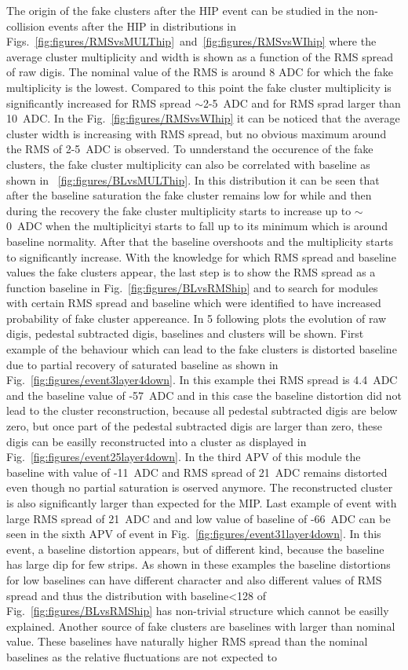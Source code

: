 The origin of the fake clusters after the HIP event can be studied in the non-collision events after the HIP in distributions in Figs.~\ref{fig:figures/RMSvsMULThip}~and~\ref{fig:figures/RMSvsWIhip} where the average cluster multiplicity and width is shown as a function of the RMS spread of raw digis. The nominal value of the RMS is around 8 ADC for which the fake multiplicity is the lowest. Compared to this point the fake cluster multiplicity is significantly increased for RMS spread $\sim$2-5~ADC and for RMS sprad larger than 10~ADC. In the Fig.~\ref{fig:figures/RMSvsWIhip} it can be noticed that the average cluster width is increasing with RMS spread, but no obvious maximum around the RMS of 2-5~ADC is observed. To unnderstand the occurence of the fake clusters, the fake cluster multiplicity can also be correlated with baseline as shown in ~\ref{fig:figures/BLvsMULThip}. In this distribution it can be seen that after the baseline saturation the fake cluster remains low for while and then during the recovery the fake cluster multiplicity starts to increase up to $\sim$ 0~ADC when the multiplicityi starts to fall up to its minimum which is around baseline normality. After that the baseline overshoots and the multiplicity starts to significantly increase. With the knowledge for which RMS spread and baseline values the fake clusters appear, the last step is to show the RMS spread as a function baseline in Fig.~\ref{fig:figures/BLvsRMShip} and to search for modules with certain RMS spread and baseline which were identified to have increased probability of fake cluster appereance. In 5 following plots the evolution of raw digis, pedestal subtracted digis, baselines and clusters will be shown. First example of the behaviour which can lead to the fake clusters is distorted baseline due to partial recovery of saturated baseline as shown in Fig.~\ref{fig:figures/event3layer4down}. In this example thei RMS spread is 4.4~ADC and the baseline value of -57~ADC and in this case the baseline distortion did not lead to the cluster reconstruction, because all pedestal subtracted digis are below zero, but once part of the pedestal subtracted digis are larger than zero, these digis can be easilly reconstructed into a cluster as displayed in Fig.~\ref{fig:figures/event25layer4down}. In the third APV of this module the baseline with value of -11~ADC and RMS spread of 21~ADC remains distorted even though no partial saturation is oserved anymore. The reconstructed cluster is also significantly larger than expected for the MIP. Last example of event with large RMS spread of 21~ADC and and low value of baseline of -66~ADC can be seen in the sixth APV of event in Fig.~\ref{fig:figures/event31layer4down}. In this event, a baseline distortion appears, but of different kind, because the baseline has large dip for few strips. As shown in these examples the baseline distortions for low baselines can have different character and also different values of RMS spread and thus the distribution with baseline<128 of Fig.~\ref{fig:figures/BLvsRMShip} has non-trivial structure which cannot be easilly explained. Another source of fake clusters are baselines with larger than nominal value. These baselines have naturally higher RMS spread than the nominal baselines as the relative fluctuations are not expected to 